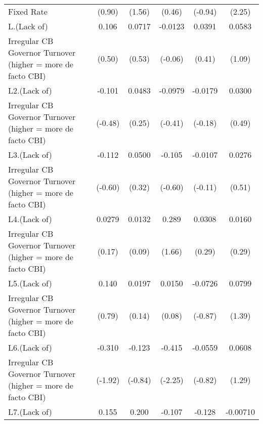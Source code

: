 {\begin{tabular}{l*{5}{c}}
Fixed Rate          &      (0.90)         &      (1.56)         &      (0.46)         &     (-0.94)         &      (2.25)         \\
[1em]
L.(Lack of)         &       0.106         &      0.0717         &     -0.0123         &      0.0391         &      0.0583         \\
Irregular CB Governor Turnover (higher = more de facto CBI)&      (0.50)         &      (0.53)         &     (-0.06)         &      (0.41)         &      (1.09)         \\
[1em]
L2.(Lack of)        &      -0.101         &      0.0483         &     -0.0979         &     -0.0179         &      0.0300         \\
Irregular CB Governor Turnover (higher = more de facto CBI)&     (-0.48)         &      (0.25)         &     (-0.41)         &     (-0.18)         &      (0.49)         \\
[1em]
L3.(Lack of)        &      -0.112         &      0.0500         &      -0.105         &     -0.0107         &      0.0276         \\
Irregular CB Governor Turnover (higher = more de facto CBI)&     (-0.60)         &      (0.32)         &     (-0.60)         &     (-0.11)         &      (0.51)         \\
[1em]
L4.(Lack of)        &      0.0279         &      0.0132         &       0.289         &      0.0308         &      0.0160         \\
Irregular CB Governor Turnover (higher = more de facto CBI)&      (0.17)         &      (0.09)         &      (1.66)         &      (0.29)         &      (0.29)         \\
[1em]
L5.(Lack of)        &       0.140         &      0.0197         &      0.0150         &     -0.0726         &      0.0799         \\
Irregular CB Governor Turnover (higher = more de facto CBI)&      (0.79)         &      (0.14)         &      (0.08)         &     (-0.87)         &      (1.39)         \\
[1em]
L6.(Lack of)        &      -0.310         &      -0.123         &      -0.415\sym{*}  &     -0.0559         &      0.0608         \\
Irregular CB Governor Turnover (higher = more de facto CBI)&     (-1.92)         &     (-0.84)         &     (-2.25)         &     (-0.82)         &      (1.29)         \\
[1em]
L7.(Lack of)        &       0.155         &       0.200         &      -0.107         &      -0.128\sym{*}  &    -0.00710         \\

\end{tabular}}
